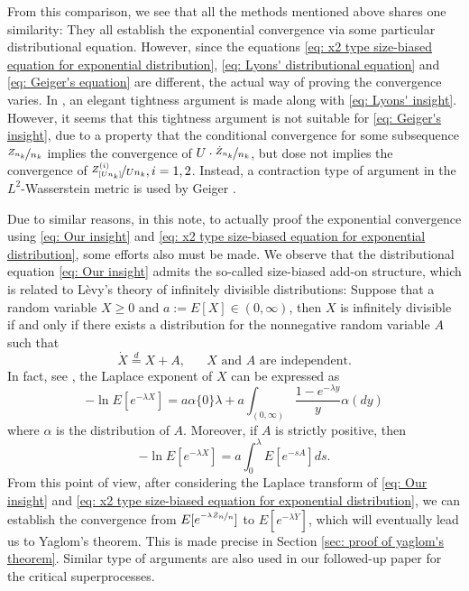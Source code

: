 \documentclass[12pt,a4paper]{amsart}
\numberwithin{equation}{section}
\begin{document}
	From this comparison, we see that all the methods mentioned above shares one similarity: They all establish the exponential convergence via some particular distributional equation. 
	However, since the equations \eqref{eq: x2 type size-biased equation for exponential distribution}, \eqref{eq: Lyons' distributional equation} and \eqref{eq: Geiger's equation} are different, the actual way of proving the convergence varies.
	In \cite{lyons1995conceptual}, an elegant tightness argument is made along with \eqref{eq: Lyons' insight}. 
	However, it seems that this tightness argument is not suitable for \eqref{eq: Geiger's insight}, due to a property that the conditional convergence for some subsequence $\nicefrac{Z_{n_k}}{n_k}$ implies the convergence of $U \cdot \nicefrac{\dot Z_{n_k}}{n_k}$, but dose not implies the convergence of $\nicefrac{Z^{(i)}_{[Un_k]}}{Un_k}, i=1, 2$. 
	Instead, a contraction type of argument in the $L^2$-Wasserstein metric is used by Geiger \cite{geiger2000new}.
	
	Due to similar reasons, in this note, to actually proof the exponential convergence using \eqref{eq: Our insight} and \eqref{eq: x2 type size-biased equation for exponential distribution}, some efforts also must be made. 
	We observe that the distributional equation \eqref{eq: Our insight} admits the so-called size-biased add-on structure, which is related to L\`evy's theory of infinitely divisible distributions: Suppose that a random variable $X \geq 0$ and $ a := E [X]\in (0,\infty)$, then $X$ is infinitely divisible if and only if there exists a distribution for the nonnegative random variable $A$ such that
\[
	\dot X 
	\overset{d} = X + A,
	\quad \text{ $X$ and $A$ are independent.}
\]  
	In fact, see \cite[Theorem 10.1]{ArratiaGoldsteinKochman2013}, the Laplace exponent of $X$ can be expressed as
\[
	-\ln E[ e^{-\lambda X}] =  a \alpha\{0\} \lambda+ a \int_{(0,\infty)} \frac{1 - e^{-\lambda y}}{y} \alpha(dy)
\]
	where $\alpha$ is the distribution of $A$.
	Moreover, if $A$ is strictly positive, then
\begin{equation}\label{eq: Laplace exponent for size-biased add-on equation}
	-\ln E[ e^{-\lambda X}] 
	=  a  \int_0^\lambda E [e^{-s A}] ds.
\end{equation}
	From this point of view, after considering the Laplace transform of \eqref{eq: Our insight} and \eqref{eq: x2 type size-biased equation for exponential distribution}, we can establish the convergence from $E[e^{\nicefrac{-\lambda \dot Z_n}{n}}]$ to $E[e^{-\lambda \dot {Y}}]$, which will eventually lead us to Yaglom's theorem.
	This is made precise in Section \ref{sec: proof of yaglom's theorem}.
	Similar type of arguments are also used in our followed-up paper \cite{RenSongSun2017Spine} for the critical superprocesses.
	
\end{document}
